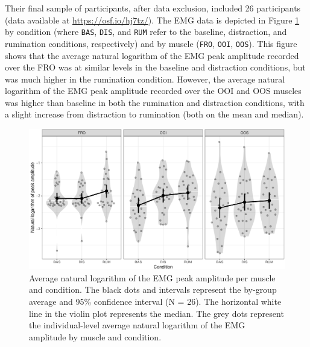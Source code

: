 \documentclass[
  english,
  man, donotrepeattitle,floatsintext]{apa6}
\begin{document}
Their final sample of participants, after data exclusion, included 26 participants (data available at \url{https://osf.io/hj7tz/}). The EMG data is depicted in Figure \ref{fig:general} by condition (where \texttt{BAS}, \texttt{DIS}, and \texttt{RUM} refer to the baseline, distraction, and rumination conditions, respectively) and by muscle (\texttt{FRO}, \texttt{OOI}, \texttt{OOS}). This figure shows that the average natural logarithm of the EMG peak amplitude recorded over the FRO was at similar levels in the baseline and distraction conditions, but was much higher in the rumination condition. However, the average natural logarithm of the EMG peak amplitude recorded over the OOI and OOS muscles was higher than baseline in both the rumination and distraction conditions, with a slight increase from distraction to rumination (both on the mean and median).

\begin{figure}[!htb]

{\centering \includegraphics[width=1\linewidth]{manuscript_files/figure-latex/general-1} 

}

\caption{Average natural logarithm of the EMG peak amplitude per muscle and condition. The black dots and intervals represent the by-group average and 95\% confidence interval (N = 26). The horizontal white line in the violin plot represents the median. The grey dots represent the individual-level average natural logarithm of the EMG amplitude by muscle and condition.}\label{fig:general}
\end{figure}
\end{document}
